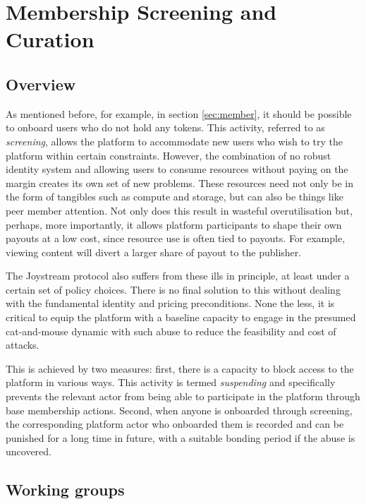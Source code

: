\documentclass{article}
\begin{document}
\section{Membership Screening and Curation} \label{sec:membership_curation}

\subsection{Overview}

As mentioned before, for example, in section \ref{sec:member}, it should be possible to onboard users who do not hold any tokens. This activity, referred to as  \textit{screening}, allows the platform to accommodate new users who wish to try the platform within certain constraints. However, the combination of no robust identity system and allowing users to consume resources without paying on the margin creates its own set of new problems. These resources need not only be in the form of tangibles such as compute and storage, but can also be things like peer member attention. Not only does this result in wasteful overutilisation but, perhaps, more importantly, it allows platform participants to shape their own payouts at a low cost, since resource use is often tied to payouts. For example, viewing content will divert a larger share of payout to the publisher.

The Joystream protocol also suffers from these ills in principle, at least under a certain set of policy choices. There is no final solution to this without dealing with the fundamental identity and pricing preconditions. None the less, it is critical to equip the platform with a baseline capacity to engage in the presumed cat-and-mouse dynamic with such abuse to reduce the feasibility and cost of attacks.

This is achieved by two measures: first, there is a capacity to block access to the platform in various ways. This activity is termed \textit{suspending} and specifically prevents the relevant actor from being able to participate in the platform through base membership actions.
Second, when anyone is onboarded through screening, the corresponding platform actor who onboarded them is recorded and can be punished for a long time in  future, with a suitable bonding period if the abuse is uncovered.

\subsection{Working groups}
\end{document}
